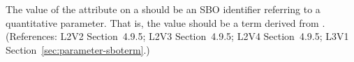 The value of the  attribute on a \Parameter should be an SBO
identifier referring to a quantitative parameter.  That is, the value should
be a term derived from \sboparameter.  (References: L2V2 Section~4.9.5; L2V3
Section~4.9.5; L2V4 Section~4.9.5; L3V1 Section~\ref{sec:parameter-sboterm}.)
